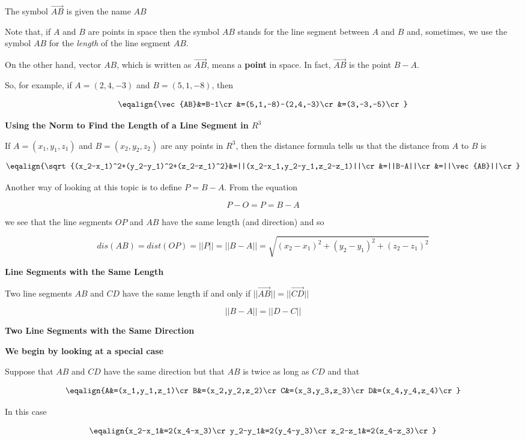 \vskip 1mm
The symbol $\vec{AB}$ is given the name $AB$

\vskip 1mm
Note that, if $A$ and $B$ are points in space then the symbol $AB$ stands for the line segment between $A$ and $B$ and, sometimes, we use the symbol $AB$ for the {\it length} of the line segment $AB$.

\vskip 1mm
On the other hand, vector $AB$, which is written as $\vec{AB}$, means a {\bf point} in space. In fact, $\vec{AB}$ is the point $B-A$.

\vskip 1mm
So, for example, if $A=(2,4,-3)$ and $B=(5,1,-8)$, then

$$\eqalign{\vec{AB}&=B-1\cr
	&=(5,1,-8)-(2,4,-3)\cr
	&=(3,-3,-5)\cr}$$

\filbreak
\vskip 1cm
{\bf Using the Norm to Find the Length of a Line Segment in $R^3$}

\vskip 1mm
If $A=(x_1,y_1,z_1)$ and $B=(x_2,y_2,z_2)$ are any points in $R^3$, then the distance formula tells us that the distance from $A$ to $B$ is

$$\eqalign{\sqrt{(x_2-x_1)^2+(y_2-y_1)^2+(z_2-z_1)^2}&=||(x_2-x_1,y_2-y_1,z_2-z_1)||\cr
							&=||B-A||\cr
							&=||\vec{AB}||\cr}$$

Another way of looking at this topic is to define $P=B-A$. From the equation

$$P-O=P=B-A$$

 we see that the line segments $OP$ and $AB$ have the same length (and direction) and so

$$dis(AB)=dist(OP)=||P||=||B-A||=\sqrt{(x_2-x_1)^2+(y_2-y_1)^2+(z_2-z_1)^2}$$

\filbreak
\vskip 1cm
{\bf Line Segments with the Same Length}

\vskip 1mm
Two line segments $AB$ and $CD$ have the same length if and only if $||\vec{AB}||=||\vec{CD}||$

$$||B-A||=||D-C||$$

\filbreak
\vskip 1cm
{\bf Two Line Segments with the Same Direction}

\vskip 1cm
{\bf We begin by looking at a special case}

\vskip 1mm
Suppose that $AB$ and $CD$ have the same direction but that $AB$ is twice as long as $CD$ and that

$$\eqalign{A&=(x_1,y_1,z_1)\cr
	B&=(x_2,y_2,z_2)\cr
	C&=(x_3,y_3,z_3)\cr
	D&=(x_4,y_4,z_4)\cr}$$

In this case

$$\eqalign{x_2-x_1&=2(x_4-x_3)\cr
	y_2-y_1&=2(y_4-y_3)\cr
	z_2-z_1&=2(z_4-z_3)\cr}$$


